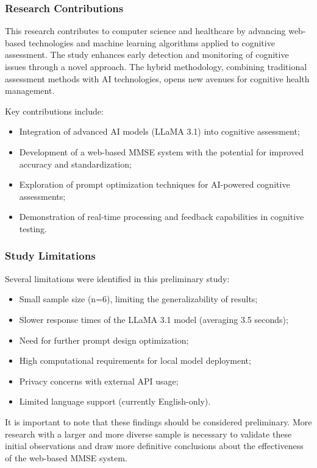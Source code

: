 \subsubsection{Research Contributions}
This research contributes to computer science and healthcare by advancing web-based technologies and machine learning algorithms applied to cognitive assessment. The study enhances early detection and monitoring of cognitive issues through a novel approach. The hybrid methodology, combining traditional assessment methods with AI technologies, opens new avenues for cognitive health management.

Key contributions include:
\begin{itemize}
\item Integration of advanced AI models (LLaMA 3.1) into cognitive assessment;
\item Development of a web-based MMSE system with the potential for improved accuracy and standardization;
\item Exploration of prompt optimization techniques for AI-powered cognitive assessments;
\item Demonstration of real-time processing and feedback capabilities in cognitive testing.
\end{itemize}
\subsubsection{Study Limitations}
Several limitations were identified in this preliminary study:
\begin{itemize}
\item Small sample size (n=6), limiting the generalizability of results;
\item Slower response times of the LLaMA 3.1 model (averaging 3.5 seconds);
\item Need for further prompt design optimization;
\item High computational requirements for local model deployment;
\item Privacy concerns with external API usage;
\item Limited language support (currently English-only).
\end{itemize}

It is important to note that these findings should be considered preliminary. More research with a larger and more diverse sample is necessary to validate these initial observations and draw more definitive conclusions about the effectiveness of the web-based MMSE system.

